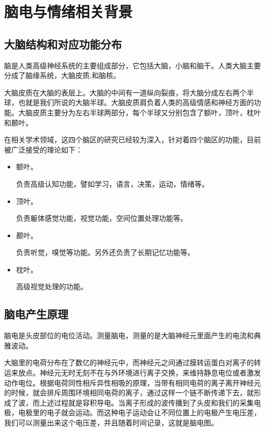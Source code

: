 
\chapter{脑电与情绪相关背景}
\label{chap:chap2x}

\section{大脑结构和对应功能分布}
	脑是人类高级神经系统的主要组成部分，它包括大脑，小脑和脑干。人类大脑主要分成了脑缘系统，大脑皮质,和脑核。
	
	大脑皮质在大脑的表层上。大脑的中间有一道纵向裂痕，将大脑分成左右两个半球，也就是我们所说的大脑半球。大脑皮质肩负着人类的高级情感和神经方面的功能。大脑皮质主要分为左右半球两部分，每个半球又分别包含了额叶，顶叶，枕叶和颞叶。
	
	在相关学术领域，这四个脑区的研究已经较为深入，针对着四个脑区的功能，目前被广泛接受的理论如下：
	\begin{itemize}
		\item 额叶。
		
			负责高级认知功能，譬如学习，语言，决策，运动，情绪等。
		\item 顶叶。
		
			负责躯体感觉功能，视觉功能，空间位置处理功能等。
		\item 颞叶。
			
			负责听觉，嗅觉等功能。另外还负责了长期记忆功能等。
		\item  枕叶。
		
			高级视觉处理的功能。
	\end{itemize}
	
\section{脑电产生原理}
	
	脑电是头皮部位的电位活动。测量脑电，测量的是大脑神经元里面产生的电流和典雅波动。
	
	大脑里的电荷分布在了数亿的神经元中，而神经元之间通过膜转运蛋白对离子的转运来放点。神经元无时无刻不在与外环境进行离子交换，来维持静息电位或者激发动作电位。根据电荷同性相斥异性相吸的原理，当带有相同电荷的离子离开神经元的时候，就会排斥周围环境相同电荷的离子，通过这样一个链不断传递下去，就形成了波，而上述过程就是容积导电。当离子形成的波传播到了头皮和我们的采集电极，电极里的电子就会运动。而这种电子运动会让不同位置上的电极产生电压差，我们可以测量出来这个电压差，并且随着时间记录，这就是脑电图。
	
